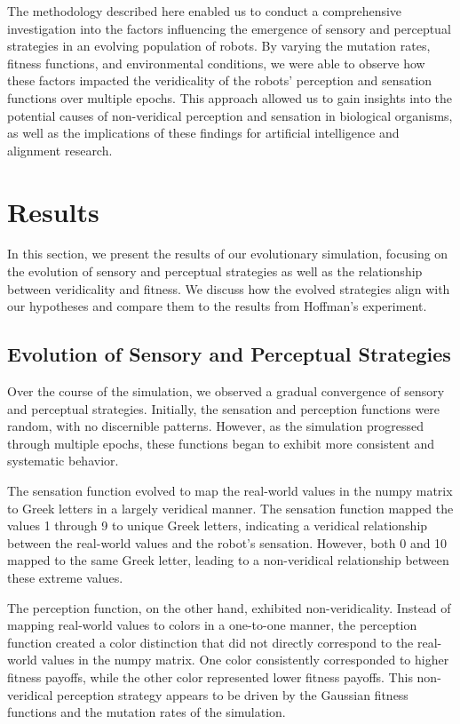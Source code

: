 \documentclass{article}[10pt]
\begin{document}
The methodology described here enabled us to conduct a comprehensive investigation into the factors influencing the emergence of sensory and perceptual strategies in an evolving population of robots. By varying the mutation rates, fitness functions, and environmental conditions, we were able to observe how these factors impacted the veridicality of the robots' perception and sensation functions over multiple epochs. This approach allowed us to gain insights into the potential causes of non-veridical perception and sensation in biological organisms, as well as the implications of these findings for artificial intelligence and alignment research.

\section{Results}

In this section, we present the results of our evolutionary simulation, focusing on the evolution of sensory and perceptual strategies as well as the relationship between veridicality and fitness. We discuss how the evolved strategies align with our hypotheses and compare them to the results from Hoffman's experiment.

\subsection{Evolution of Sensory and Perceptual Strategies}

Over the course of the simulation, we observed a gradual convergence of sensory and perceptual strategies. Initially, the sensation and perception functions were random, with no discernible patterns. However, as the simulation progressed through multiple epochs, these functions began to exhibit more consistent and systematic behavior.

The sensation function evolved to map the real-world values in the numpy matrix to Greek letters in a largely veridical manner. The sensation function mapped the values 1 through 9 to unique Greek letters, indicating a veridical relationship between the real-world values and the robot's sensation. However, both 0 and 10 mapped to the same Greek letter, leading to a non-veridical relationship between these extreme values.

The perception function, on the other hand, exhibited non-veridicality. Instead of mapping real-world values to colors in a one-to-one manner, the perception function created a color distinction that did not directly correspond to the real-world values in the numpy matrix. One color consistently corresponded to higher fitness payoffs, while the other color represented lower fitness payoffs. This non-veridical perception strategy appears to be driven by the Gaussian fitness functions and the mutation rates of the simulation.
\end{document}
